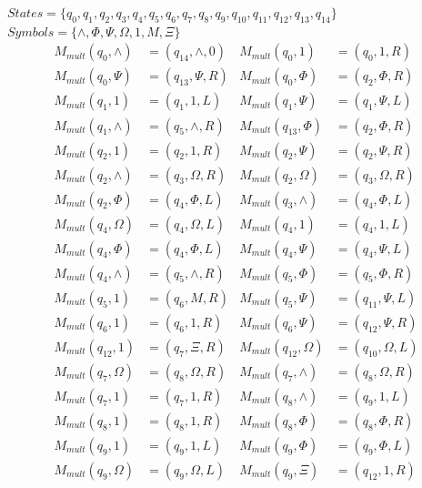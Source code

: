 \documentclass[11pt]{article}
\begin{document}
$States = \{q_0, q_1, q_2, q_3, q_4, q_5, q_6, q_7, q_8, q_9, q_{10}, q_{11}, q_{12}, q_{13}, q_{14}\}$\\
$Symbols = \{\wedge, \Phi, \Psi, \Omega, 1, M, \Xi \}$
\begin{align*}
M_{mult}(q_0, \wedge) &= (q_{14}, \wedge, 0)    &     M_{mult}(q_0, 1) &= (q_{0}, 1, R) \\
M_{mult}(q_{0}, \Psi) &= (q_{13}, \Psi, R)    &     M_{mult}(q_{0}, \Phi) &= (q_{2}, \Phi, R) \\
M_{mult}(q_{1}, 1) &= (q_{1}, 1, L)    &     M_{mult}(q_{1}, \Psi) &= (q_{1}, \Psi, L) \\
M_{mult}(q_{1}, \wedge) &= (q_{5}, \wedge, R)    &     M_{mult}(q_{13}, \Phi) &= (q_{2}, \Phi, R) \\
M_{mult}(q_{2}, 1) &= (q_{2}, 1, R)    &     M_{mult}(q_{2}, \Psi) &= (q_{2}, \Psi, R) \\
M_{mult}(q_{2}, \wedge) &= (q_{3}, \Omega, R)    &     M_{mult}(q_{2}, \Omega) &= (q_{3}, \Omega, R) \\
M_{mult}(q_{2}, \Phi) &= (q_{4}, \Phi, L)    &     M_{mult}(q_{3}, \wedge) &= (q_{4}, \Phi, L) \\
M_{mult}(q_{4}, \Omega) &= (q_{4}, \Omega, L)    &     M_{mult}(q_{4}, 1) &= (q_{4}, 1, L) \\
M_{mult}(q_{4}, \Phi) &= (q_{4}, \Phi, L)    &     M_{mult}(q_{4}, \Psi) &= (q_{4}, \Psi, L) \\
M_{mult}(q_{4}, \wedge) &= (q_{5}, \wedge, R)    &     M_{mult}(q_{5}, \Phi) &= (q_{5}, \Phi, R) \\
M_{mult}(q_{5}, 1) &= (q_{6}, M, R)    &     M_{mult}(q_{5}, \Psi) &= (q_{11}, \Psi, L) \\
M_{mult}(q_{6}, 1) &= (q_{6}, 1, R)    &     M_{mult}(q_{6}, \Psi) &= (q_{12}, \Psi, R) \\
M_{mult}(q_{12}, 1) &= (q_{7}, \Xi, R)    &     M_{mult}(q_{12}, \Omega) &= (q_{10}, \Omega, L) \\
M_{mult}(q_{7}, \Omega) &= (q_{8}, \Omega, R)    &     M_{mult}(q_{7}, \wedge) &= (q_{8}, \Omega, R) \\
M_{mult}(q_{7}, 1) &= (q_{7}, 1, R)	&	M_{mult}(q_{8}, \wedge) &= (q_{9}, 1, L) \\
M_{mult}(q_{8}, 1) &= (q_{8}, 1, R)	&	M_{mult}(q_{8}, \Phi) &= (q_{8}, \Phi, R) \\
M_{mult}(q_{9}, 1) &= (q_{9}, 1, L)	&	M_{mult}(q_{9}, \Phi) &= (q_{9}, \Phi, L) \\
M_{mult}(q_{9}, \Omega) &= (q_{9}, \Omega, L)	&	M_{mult}(q_{9}, \Xi) &= (q_{12}, 1, R) \\

\end{align*}
\end{document}
